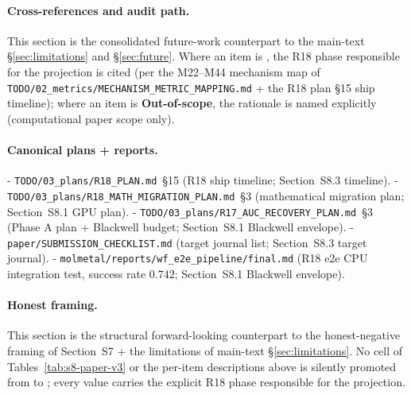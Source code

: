\paragraph{Cross-references and audit path.}
This section is the consolidated future-work counterpart to
the main-text \S\ref{sec:limitations} and \S\ref{sec:future}.
Where an item is \PROJECTED{}, the R18 phase responsible for
the projection is cited (per the M22--M44 mechanism map of
\texttt{TODO/02\_metrics/MECHANISM\_METRIC\_MAPPING.md} +
the R18 plan §15 ship timeline); where an item is
\textbf{Out-of-scope}, the rationale is named explicitly
(computational paper scope only).

\paragraph{Canonical plans + reports.}
- \texttt{TODO/03\_plans/R18\_PLAN.md}~§15 (R18 ship timeline;
  Section~S8.3 timeline).
- \texttt{TODO/03\_plans/R18\_MATH\_MIGRATION\_PLAN.md}~§3
  (mathematical migration plan; Section~S8.1 GPU plan).
- \texttt{TODO/03\_plans/R17\_AUC\_RECOVERY\_PLAN.md}~§3
  (Phase A plan + Blackwell budget; Section~S8.1 Blackwell
  envelope).
- \texttt{paper/SUBMISSION_CHECKLIST.md} (target journal list;
  Section~S8.3 target journal).
- \texttt{molmetal/reports/wf\_e2e\_pipeline/final.md}
  (R18 e2e CPU integration test, success rate $0.742$;
  Section~S8.1 Blackwell envelope).

\paragraph{Honest framing.}
This section is the structural forward-looking counterpart to
the honest-negative framing of Section~S7 + the
limitations of main-text \S\ref{sec:limitations}.  No cell
of Tables~\ref{tab:s8-paper-v3} or the per-item descriptions
above is silently promoted from \DESIGN{} to \MEASURED{};
every \PROJECTED{} value carries the explicit R18 phase
responsible for the projection.

